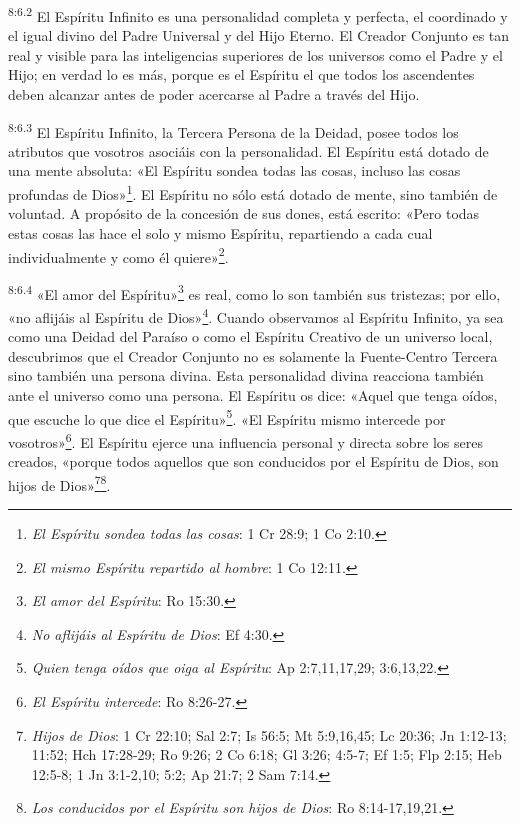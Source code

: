 \par
\textsuperscript{8:6.2} El Espíritu Infinito es una personalidad completa y perfecta, el coordinado y el igual divino del Padre Universal y del Hijo Eterno. El Creador Conjunto es tan real y visible para las inteligencias superiores de los universos como el Padre y el Hijo; en verdad lo es más, porque es el Espíritu el que todos los ascendentes deben alcanzar antes de poder acercarse al Padre a través del Hijo.

\par
\textsuperscript{8:6.3} El Espíritu Infinito, la Tercera Persona de la Deidad, posee todos los atributos que vosotros asociáis con la personalidad. El Espíritu está dotado de una mente absoluta: «El Espíritu sondea todas las cosas, incluso las cosas profundas de Dios»\footnote{\textit{El Espíritu sondea todas las cosas}: 1 Cr 28:9; 1 Co 2:10.}. El Espíritu no sólo está dotado de mente, sino también de voluntad. A propósito de la concesión de sus dones, está escrito: «Pero todas estas cosas las hace el solo y mismo Espíritu, repartiendo a cada cual individualmente y como él quiere»\footnote{\textit{El mismo Espíritu repartido al hombre}: 1 Co 12:11.}.

\par
\textsuperscript{8:6.4} «El amor del Espíritu»\footnote{\textit{El amor del Espíritu}: Ro 15:30.} es real, como lo son también sus tristezas; por ello, «no aflijáis al Espíritu de Dios»\footnote{\textit{No aflijáis al Espíritu de Dios}: Ef 4:30.}. Cuando observamos al Espíritu Infinito, ya sea como una Deidad del Paraíso o como el Espíritu Creativo de un universo local, descubrimos que el Creador Conjunto no es solamente la Fuente-Centro Tercera sino también una persona divina. Esta personalidad divina reacciona también ante el universo como una persona. El Espíritu os dice: «Aquel que tenga oídos, que escuche lo que dice el Espíritu»\footnote{\textit{Quien tenga oídos que oiga al Espíritu}: Ap 2:7,11,17,29; 3:6,13,22.}. «El Espíritu mismo intercede por vosotros»\footnote{\textit{El Espíritu intercede}: Ro 8:26-27.}. El Espíritu ejerce una influencia personal y directa sobre los seres creados, «porque todos aquellos que son conducidos por el Espíritu de Dios, son hijos de Dios»\footnote{\textit{Hijos de Dios}: 1 Cr 22:10; Sal 2:7; Is 56:5; Mt 5:9,16,45; Lc 20:36; Jn 1:12-13; 11:52; Hch 17:28-29; Ro 9:26; 2 Co 6:18; Gl 3:26; 4:5-7; Ef 1:5; Flp 2:15; Heb 12:5-8; 1 Jn 3:1-2,10; 5:2; Ap 21:7; 2 Sam 7:14.}\footnote{\textit{Los conducidos por el Espíritu son hijos de Dios}: Ro 8:14-17,19,21.}.

